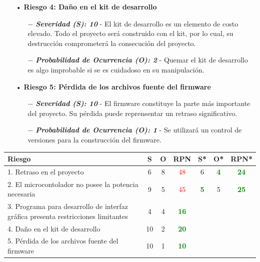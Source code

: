 \documentclass[11pt]{charter}
\begin{document}
\begin{itemize}
 \item[•] \textbf{Riesgo 4: Daño en el kit de desarrollo}
  \begin{itemize}
  	\item[$-$] \textit{\textbf{Severidad (S): 10}} - El kit de desarrollo es un elemento de costo elevado. Todo el proyecto será construido con el kit, por lo cual, su destrucción comprometerá la consecución del proyecto.
  	\item[$-$] \textit{\textbf{Probabilidad de Ocurrencia (O): 2}} - Quemar el kit de desarrollo es algo improbable si se es cuidadoso en su manipulación.
  \end{itemize}
\end{itemize}

\begin{itemize}
 \item[•] \textbf{Riesgo 5: Pérdida de los archivos fuente del firmware}
  \begin{itemize}
  	\item[$-$] \textit{\textbf{Severidad (S): 10}} - El firmware constituye la parte más importante del proyecto. Su pérdida puede reprensentar un retraso significativo.
  	\item[$-$] \textit{\textbf{Probabilidad de Ocurrencia (O): 1}} - Se utilizará un control de versiones para la construcción del firmware. 
  \end{itemize}
\end{itemize}

\clearpage

\begin{table}[htpb]
\centering
\begin{tabularx}{\linewidth}{@{}|X|c|c|c|c|c|c|@{}}
\hline
\rowcolor[HTML]{C0C0C0} 
Riesgo & S & O & RPN & S* & O* & RPN* \\ \hline
1. Retraso en el proyecto & 6 & 8 & \textcolor{red}{48} &  6  & \textbf{\textcolor{green}{4}}  & \textbf{\textcolor{green}{24}}     \\ \hline
2. El microcontolador no posee la potencia necesaria       & 9 & 5 & \textcolor{red}{45} & \textbf{\textcolor{green}{5}} & 5  & \textbf{\textcolor{green}{25}}  \\ \hline
3. Programa para desarrollo de interfaz gráfica presenta restricciones limitantes      & 4 & 4 & \textbf{\textcolor{green}{16}}   &    &    &      \\ \hline
4. Daño en el kit de desarrollo  & 10  & 2 &  \textbf{\textcolor{green}{20}}   &    &    &      \\ \hline
5. Pérdida de los archivos fuente del firmware & 10  & 1 & \textbf{\textcolor{green}{10}} &    &    &      \\ \hline
\end{tabularx}%
\end{table}
\end{document}
